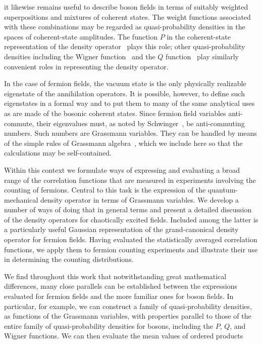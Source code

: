\documentclass[12pt]{article}
\begin{document}
it likewise remains useful to describe boson fields
in terms of suitably weighted superpositions and mixtures
of coherent states.
The weight functions associated with these combinations
may be regarded as quasi-probability densities in the spaces of
coherent-state amplitudes.
The function $ P $ in the coherent-state representation
of the density operator~\cite{rjg2,GDW} plays this role;
other quasi-probability densities including
the Wigner function~\cite{GDW,kcrg1}
and the $ Q $ function~\cite{GDW,kcrg1} 
play similarly convenient roles
in representing the density operator.
\par
In the case of fermion fields,
the vacuum state is the only physically realizable eigenstate
of the annihilation operators.
It is possible, however, to define such eigenstates
in a formal way
and to put them to many of the same analytical uses as are made
of the bosonic coherent states.
Since fermion field variables anti-commute,
their eigenvalues must, as noted by Schwinger~\cite{JS4},
be anti-commuting numbers.
Such numbers are Grassmann variables.
They can be handled by means of the simple rules
of Grassmann algebra~\cite{b}, which we include here
so that the calculations may be self-contained.
\par
Within this context we formulate ways of expressing
and evaluating a broad range of the correlation functions
that are measured in experiments involving the counting of fermions.
Central to this task is the expression of the quantum-mechanical
density operator in terms of Grassmann variables. 
We develop a number of ways of doing that in general terms
and present a detailed discussion of the density operators
for chaotically excited fields.
Included among the latter is a particularly useful
Gaussian representation of the grand-canonical density operator
for fermion fields.
Having evaluated the statistically averaged correlation
functions, we apply them to fermion counting experiments
and illustrate their use in determining the counting distributions.
\par
We find throughout this work that
notwithstanding great mathematical differences,
many close parallels can be established between
the expressions evaluated for fermion fields
and the more familiar ones for boson fields.
In particular, for example,
we can construct a family of quasi-probability
densities, as functions of the Grassmann variables,
with properties parallel to those of the entire
family of quasi-probability densities for bosons,
including the $P$, $Q$, and Wigner functions.
We can then evaluate the mean values of ordered products
\end{document}

